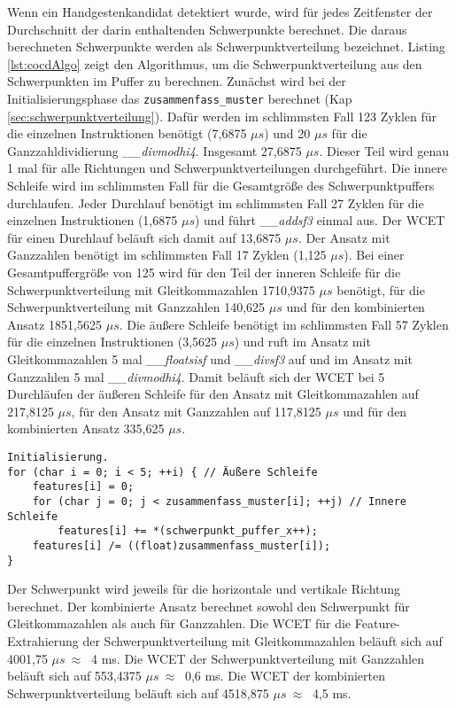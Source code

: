 Wenn ein Handgestenkandidat detektiert wurde, wird für jedes Zeitfenster der Durchschnitt der darin enthaltenden Schwerpunkte berechnet. Die daraus berechneten Schwerpunkte werden als Schwerpunktverteilung bezeichnet.
Listing \ref{lst:cocdAlgo} zeigt den Algorithmus, um die Schwerpunktverteilung aus den Schwerpunkten im Puffer zu berechnen. Zunächst wird bei der Initialisierungsphase das \texttt{zusammenfass\_muster} berechnet
(Kap \ref{sec:schwerpunktverteilung}). Dafür werden im schlimmsten Fall 123 Zyklen für die einzelnen Instruktionen benötigt (7,6875 $\mu s$) und 20 $\mu s$ für die Ganzzahldividierung \textit{\_\_divmodhi4}. Insgesamt
27,6875 $\mu s$. Dieser Teil wird genau 1 mal für alle Richtungen und Schwerpunktverteilungen durchgeführt. Die innere Schleife wird im schlimmsten Fall für die Gesamtgröße des Schwerpunktpuffers durchlaufen.
Jeder Durchlauf benötigt im schlimmsten Fall 27 Zyklen für die einzelnen Instruktionen (1,6875 $\mu s$) und führt \textit{\_\_addsf3} einmal aus. Der WCET für einen Durchlauf beläuft sich damit auf 13,6875 $\mu s$.
Der Ansatz mit Ganzzahlen benötigt im schlimmsten Fall 17 Zyklen (1,125 $\mu s$). Bei einer Gesamtpuffergröße von 125 wird für den Teil der inneren Schleife für die Schwerpunktverteilung mit Gleitkommazahlen
1710,9375 $\mu s$ benötigt, für die Schwerpunktverteilung mit Ganzzahlen 140,625 $\mu s$ und für den kombinierten Ansatz 1851,5625 $\mu s$. Die äußere Schleife benötigt im schlimmsten Fall 57 Zyklen für die einzelnen
Instruktionen (3,5625 $\mu s$) und ruft im Ansatz mit Gleitkommazahlen 5 mal \textit{\_\_floatsisf} und \textit{\_\_divsf3} auf und im Ansatz mit Ganzzahlen 5 mal \textit{\_\_divmodhi4}. Damit beläuft sich der WCET
bei 5 Durchläufen der äußeren Schleife für den Ansatz mit Gleitkommazahlen auf 217,8125 $\mu s$, für den Ansatz mit Ganzzahlen auf 117,8125 $\mu s$ und für den kombinierten Ansatz 335,625 $\mu s$.
\begin{lstlisting}[label=lst:cocdAlgo,caption={Algorithmus um die Schwerpunktverteilung in horizontaler Richtung zu berechnen.}]
Initialisierung.
for (char i = 0; i < 5; ++i) { // Äußere Schleife
    features[i] = 0;
    for (char j = 0; j < zusammenfass_muster[i]; ++j) // Innere Schleife
        features[i] += *(schwerpunkt_puffer_x++);
    features[i] /= ((float)zusammenfass_muster[i]);
}
\end{lstlisting}
Der Schwerpunkt wird jeweils für die horizontale und vertikale Richtung berechnet. Der kombinierte Ansatz berechnet sowohl den Schwerpunkt für Gleitkommazahlen als auch für Ganzzahlen. Die WCET für die Feature-Extrahierung
der Schwerpunktverteilung mit Gleitkommazahlen beläuft sich auf 4001,75 $\mu s\ \approx\ $ 4 ms. Die WCET der Schwerpunktverteilung mit Ganzzahlen beläuft sich auf 553,4375 $\mu s\ \approx\ $ 0,6 ms. Die WCET der kombinierten
Schwerpunktverteilung beläuft sich auf 4518,875 $\mu s\ \approx\ $ 4,5 ms.

